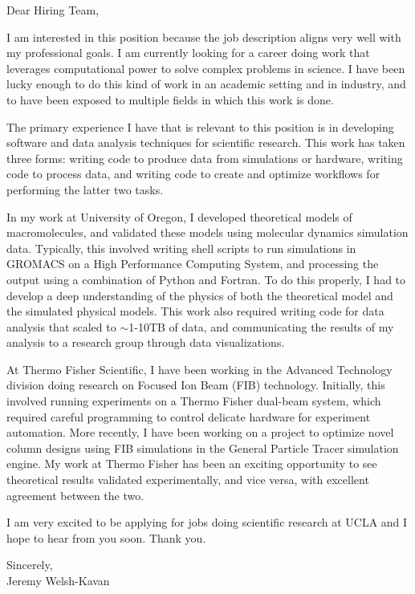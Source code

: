 \documentclass[]{letter}
\begin{document}

Dear Hiring Team, 

I am interested in this position because the job description aligns very well with my professional goals. I am currently looking for a career doing work that leverages computational power to solve complex problems in science. I have been lucky enough to do this kind of work in an academic setting and in industry, and to have been exposed to multiple fields in which this work is done. 

The primary experience I have that is relevant to this position is in developing software and data analysis techniques for scientific research. This work has taken three forms: writing code to produce data from simulations or hardware, writing code to process data, and writing code to create and optimize workflows for performing the latter two tasks. 

In my work at University of Oregon, I developed theoretical models of macromolecules, and validated these models using molecular dynamics simulation data. Typically, this involved writing shell scripts to run simulations in GROMACS on a High Performance Computing System, and processing the output using a combination of Python and Fortran. To do this properly, I had to develop a deep understanding of the physics of both the theoretical model and the simulated physical models. This work also required writing code for data analysis that scaled to $\sim$1-10TB of data, and communicating the results of my analysis to a research group through data visualizations.

At Thermo Fisher Scientific, I have been working in the Advanced Technology division doing research on Focused Ion Beam (FIB) technology. Initially, this involved running experiments on a Thermo Fisher dual-beam system, which required careful programming to control delicate hardware for experiment automation. More recently, I have been working on a project to optimize novel column designs using FIB simulations in the General Particle Tracer simulation engine. My work at Thermo Fisher has been an exciting opportunity to see theoretical results validated experimentally, and vice versa, with excellent agreement between the two. 

I am very excited to be applying for jobs doing scientific research at UCLA and I hope to hear from you soon. Thank you.

Sincerely, \\
Jeremy Welsh-Kavan
\end{document}
